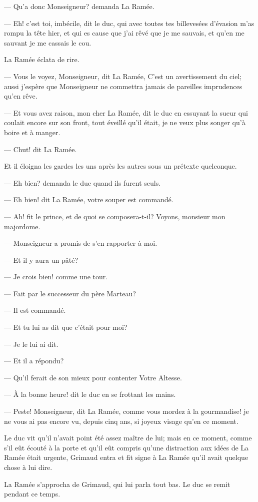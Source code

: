 — Qu'a donc Monseigneur? demanda La Ramée.

— Eh! c'est toi, imbécile, dit le duc, qui avec toutes tes billevesées d'évasion m'as rompu la tête hier, et qui es cause que j'ai rêvé que je me sauvais, et qu'en me sauvant je me cassais le cou.

La Ramée éclata de rire.

— Vous le voyez, Monseigneur, dit La Ramée, C'est un avertissement du ciel; aussi j'espère que Monseigneur ne commettra jamais de pareilles imprudences qu'en rêve.

— Et vous avez raison, mon cher La Ramée, dit le duc en essuyant la sueur qui coulait encore sur son front, tout éveillé qu'il était, je ne veux plus songer qu'à boire et à manger.

— Chut! dit La Ramée.

Et il éloigna les gardes les uns après les autres sous un prétexte quelconque.

— Eh bien? demanda le duc quand ils furent seuls.

— Eh bien! dit La Ramée, votre souper est commandé.

— Ah! fit le prince, et de quoi se composera-t-il? Voyons, monsieur mon majordome.

— Monseigneur a promis de s'en rapporter à moi.

— Et il y aura un pâté?

— Je crois bien! comme une tour.

— Fait par le successeur du père Marteau?

— Il est commandé.

— Et tu lui as dit que c'était pour moi?

— Je le lui ai dit.

— Et il a répondu?

— Qu'il ferait de son mieux pour contenter Votre Altesse.

— À la bonne heure! dit le duc en se frottant les mains.

— Peste! Monseigneur, dit La Ramée, comme vous mordez à la gourmandise! je ne vous ai pas encore vu, depuis cinq ans, si joyeux visage qu'en ce moment.

Le duc vit qu'il n'avait point été assez maître de lui; mais en ce moment, comme s'il eût écouté à la porte et qu'il eût compris qu'une distraction aux idées de La Ramée était urgente, Grimaud entra et fit signe à La Ramée qu'il avait quelque chose à lui dire.

La Ramée s'approcha de Grimaud, qui lui parla tout bas. Le duc se remit pendant ce temps.

